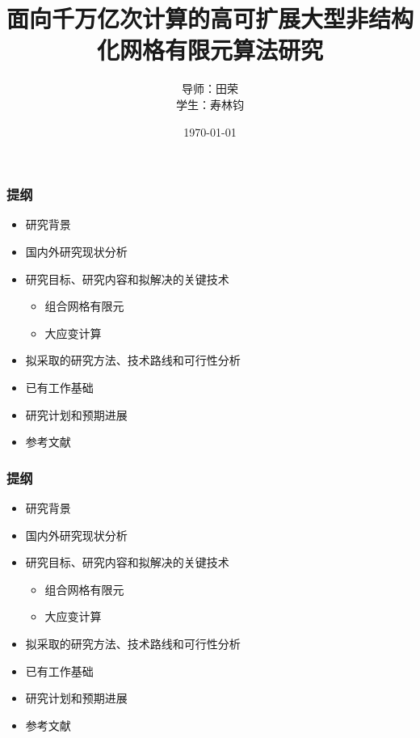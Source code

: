 \documentclass[mathserif]{beamer}
\begin{document}
\begin{CJK}{UTF8}{gkai}
	
\title{面向千万亿次计算的高可扩展大型非结构化网格有限元算法研究}
\author{导师：田荣 \\ 学生：寿林钧} 
\date{\today} 

	\begin{frame}
		\titlepage
	\end{frame}

    \begin{frame}
        \frametitle{提纲}
        \begin{itemize}
            \item 研究背景
            \item 国内外研究现状分析
            \item 研究目标、研究内容和拟解决的关键技术 
		  \begin{itemize}
		  	\item 组合网格有限元
			\item 大应变计算
		  \end{itemize}
            \item 拟采取的研究方法、技术路线和可行性分析
            \item 已有工作基础
	    \item 研究计划和预期进展
            \item 参考文献
        \end{itemize}
	\end{frame}
	
	    \begin{frame}
        \frametitle{提纲}
        \begin{itemize}
            \color{gray} 
            \item {\color{blue}研究背景}
            \item 国内外研究现状分析
            \item 研究目标、研究内容和拟解决的关键技术 
		  \begin{itemize}
		    \color{gray}
		  	\item 组合网格有限元
			\item 大应变计算
		  \end{itemize}
            \item 拟采取的研究方法、技术路线和可行性分析
            \item 已有工作基础
	    \item 研究计划和预期进展
            \item 参考文献
        \end{itemize}
	\end{frame}
	

\end{CJK}
\end{document}
